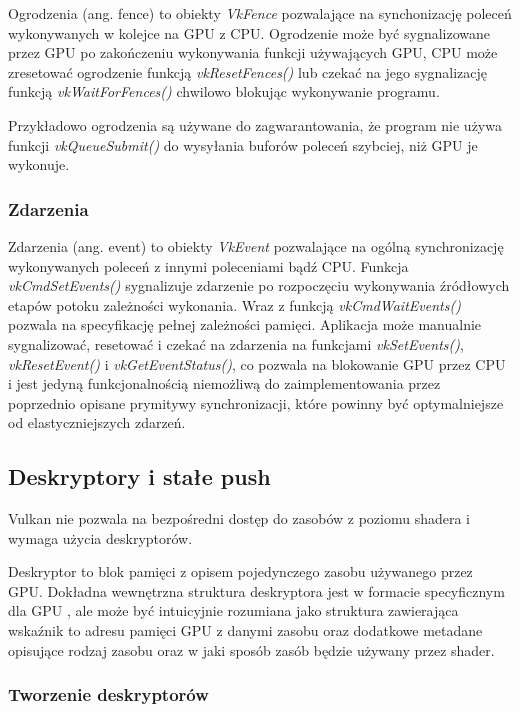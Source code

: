 Ogrodzenia (ang. fence) to obiekty \textit{VkFence} pozwalające na synchonizację poleceń wykonywanych w kolejce na GPU z CPU.
Ogrodzenie może być sygnalizowane przez GPU po zakończeniu wykonywania funkcji używających GPU, CPU może zresetować ogrodzenie
funkcją \textit{vkResetFences()} lub czekać na jego sygnalizację funkcją \textit{vkWaitForFences()} chwilowo blokując wykonywanie programu.

Przykładowo ogrodzenia są używane do zagwarantowania, że program nie używa funkcji \textit{vkQueueSubmit()} do wysyłania buforów poleceń szybciej, niż GPU je wykonuje.

\subsubsection{Zdarzenia}
Zdarzenia (ang. event) to obiekty \textit{VkEvent} pozwalające na ogólną synchronizację wykonywanych poleceń z innymi poleceniami bądź CPU.
Funkcja \textit{vkCmdSetEvents()} sygnalizuje zdarzenie po rozpoczęciu wykonywania źródłowych etapów potoku zależności wykonania. Wraz z funkcją \textit{vkCmdWaitEvents()} pozwala na specyfikację pełnej zależności pamięci.
Aplikacja może manualnie sygnalizować, resetować i czekać na zdarzenia na funkcjami \textit{vkSetEvents()}, \textit{vkResetEvent()} i \textit{vkGetEventStatus()}, co pozwala na blokowanie GPU przez CPU i jest jedyną funkcjonalnością niemożliwą do zaimplementowania przez poprzednio opisane prymitywy synchronizacji, które powinny być optymalniejsze od elastyczniejszych zdarzeń.

\subsection{Deskryptory i stałe push}

Vulkan nie pozwala na bezpośredni dostęp do zasobów z poziomu shadera i wymaga użycia deskryptorów.

Deskryptor to blok pamięci z opisem pojedynczego zasobu używanego przez GPU. Dokładna wewnętrzna struktura deskryptora jest w formacie specyficznym dla GPU \cite{DESCRIPTORSHARD}, ale może być intuicyjnie rozumiana jako struktura zawierająca wskaźnik to adresu pamięci GPU z danymi zasobu oraz dodatkowe metadane opisujące rodzaj zasobu oraz w jaki sposób zasób będzie używany przez shader.

\subsubsection{Tworzenie deskryptorów}

